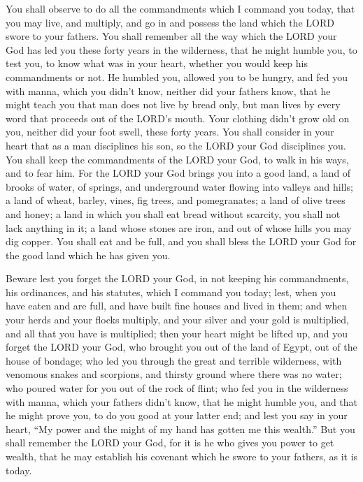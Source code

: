  You shall observe to do all the commandments which I
command you today, that you may live, and multiply, and go in and
possess the land which the LORD swore to your fathers.  You
shall remember all the way which the LORD your God has led you these
forty years in the wilderness, that he might humble you, to test you, to
know what was in your heart, whether you would keep his commandments or
not.  He humbled you, allowed you to be hungry, and fed you
with manna, which you didn't know, neither did your fathers know, that
he might teach you that man does not live by bread only, but man lives
by every word that proceeds out of the LORD's mouth.  Your
clothing didn't grow old on you, neither did your foot swell, these
forty years.  You shall consider in your heart that as a man
disciplines his son, so the LORD your God disciplines you. 
You shall keep the commandments of the LORD your God, to walk in his
ways, and to fear him.  For the LORD your God brings you
into a good land, a land of brooks of water, of springs, and underground
water flowing into valleys and hills;  a land of wheat,
barley, vines, fig trees, and pomegranates; a land of olive trees and
honey;  a land in which you shall eat bread without
scarcity, you shall not lack anything in it; a land whose stones are
iron, and out of whose hills you may dig copper.  You shall
eat and be full, and you shall bless the LORD your God for the good land
which he has given you.

 Beware lest you forget the LORD your God, in not keeping
his commandments, his ordinances, and his statutes, which I command you
today;  lest, when you have eaten and are full, and have
built fine houses and lived in them;  and when your herds
and your flocks multiply, and your silver and your gold is multiplied,
and all that you have is multiplied;  then your heart might
be lifted up, and you forget the LORD your God, who brought you out of
the land of Egypt, out of the house of bondage;  who led
you through the great and terrible wilderness, with venomous snakes and
scorpions, and thirsty ground where there was no water; who poured water
for you out of the rock of flint;  who fed you in the
wilderness with manna, which your fathers didn't know, that he might
humble you, and that he might prove you, to do you good at your latter
end;  and lest you say in your heart, ``My power and the
might of my hand has gotten me this wealth.''  But you
shall remember the LORD your God, for it is he who gives you power to
get wealth, that he may establish his covenant which he swore to your
fathers, as it is today.

